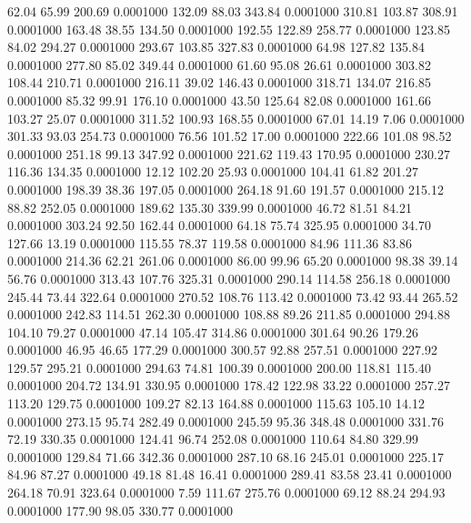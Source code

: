   62.04   65.99  200.69   0.0001000
 132.09   88.03  343.84   0.0001000
 310.81  103.87  308.91   0.0001000
 163.48   38.55  134.50   0.0001000
 192.55  122.89  258.77   0.0001000
 123.85   84.02  294.27   0.0001000
 293.67  103.85  327.83   0.0001000
  64.98  127.82  135.84   0.0001000
 277.80   85.02  349.44   0.0001000
  61.60   95.08   26.61   0.0001000
 303.82  108.44  210.71   0.0001000
 216.11   39.02  146.43   0.0001000
 318.71  134.07  216.85   0.0001000
  85.32   99.91  176.10   0.0001000
  43.50  125.64   82.08   0.0001000
 161.66  103.27   25.07   0.0001000
 311.52  100.93  168.55   0.0001000
  67.01   14.19    7.06   0.0001000
 301.33   93.03  254.73   0.0001000
  76.56  101.52   17.00   0.0001000
 222.66  101.08   98.52   0.0001000
 251.18   99.13  347.92   0.0001000
 221.62  119.43  170.95   0.0001000
 230.27  116.36  134.35   0.0001000
  12.12  102.20   25.93   0.0001000
 104.41   61.82  201.27   0.0001000
 198.39   38.36  197.05   0.0001000
 264.18   91.60  191.57   0.0001000
 215.12   88.82  252.05   0.0001000
 189.62  135.30  339.99   0.0001000
  46.72   81.51   84.21   0.0001000
 303.24   92.50  162.44   0.0001000
  64.18   75.74  325.95   0.0001000
  34.70  127.66   13.19   0.0001000
 115.55   78.37  119.58   0.0001000
  84.96  111.36   83.86   0.0001000
 214.36   62.21  261.06   0.0001000
  86.00   99.96   65.20   0.0001000
  98.38   39.14   56.76   0.0001000
 313.43  107.76  325.31   0.0001000
 290.14  114.58  256.18   0.0001000
 245.44   73.44  322.64   0.0001000
 270.52  108.76  113.42   0.0001000
  73.42   93.44  265.52   0.0001000
 242.83  114.51  262.30   0.0001000
 108.88   89.26  211.85   0.0001000
 294.88  104.10   79.27   0.0001000
  47.14  105.47  314.86   0.0001000
 301.64   90.26  179.26   0.0001000
  46.95   46.65  177.29   0.0001000
 300.57   92.88  257.51   0.0001000
 227.92  129.57  295.21   0.0001000
 294.63   74.81  100.39   0.0001000
 200.00  118.81  115.40   0.0001000
 204.72  134.91  330.95   0.0001000
 178.42  122.98   33.22   0.0001000
 257.27  113.20  129.75   0.0001000
 109.27   82.13  164.88   0.0001000
 115.63  105.10   14.12   0.0001000
 273.15   95.74  282.49   0.0001000
 245.59   95.36  348.48   0.0001000
 331.76   72.19  330.35   0.0001000
 124.41   96.74  252.08   0.0001000
 110.64   84.80  329.99   0.0001000
 129.84   71.66  342.36   0.0001000
 287.10   68.16  245.01   0.0001000
 225.17   84.96   87.27   0.0001000
  49.18   81.48   16.41   0.0001000
 289.41   83.58   23.41   0.0001000
 264.18   70.91  323.64   0.0001000
   7.59  111.67  275.76   0.0001000
  69.12   88.24  294.93   0.0001000
 177.90   98.05  330.77   0.0001000
